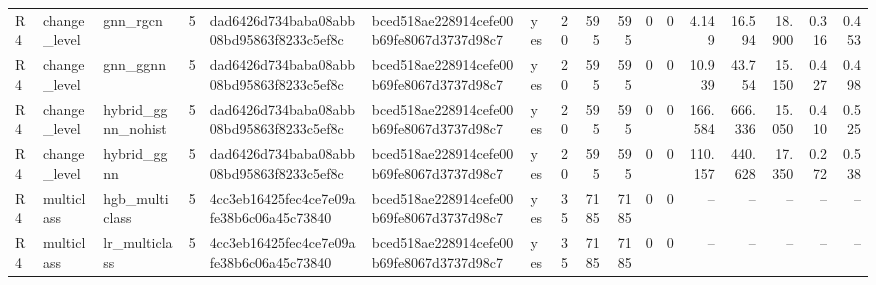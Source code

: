 \begin{table}[htbp]
{\begin{tabular}{lllrlllrrrrrrrrrr}
R4 & change\_level & gnn\_rgcn & 5 & dad6426d734baba08abb08bd95863f8233c5ef8c & bced518ae228914cefe00b69fe8067d3737d98c7 & yes & 20 & 595 & 595 & 0 & 0 & 4.149 & 16.594 & 18.900 & 0.316 & 0.453 \\
R4 & change\_level & gnn\_ggnn & 5 & dad6426d734baba08abb08bd95863f8233c5ef8c & bced518ae228914cefe00b69fe8067d3737d98c7 & yes & 20 & 595 & 595 & 0 & 0 & 10.939 & 43.754 & 15.150 & 0.427 & 0.498 \\
R4 & change\_level & hybrid\_ggnn\_nohist & 5 & dad6426d734baba08abb08bd95863f8233c5ef8c & bced518ae228914cefe00b69fe8067d3737d98c7 & yes & 20 & 595 & 595 & 0 & 0 & 166.584 & 666.336 & 15.050 & 0.410 & 0.525 \\
R4 & change\_level & hybrid\_ggnn & 5 & dad6426d734baba08abb08bd95863f8233c5ef8c & bced518ae228914cefe00b69fe8067d3737d98c7 & yes & 20 & 595 & 595 & 0 & 0 & 110.157 & 440.628 & 17.350 & 0.272 & 0.538 \\
R4 & multiclass & hgb\_multiclass & 5 & 4cc3eb16425fec4ce7e09afe38b6c06a45c73840 & bced518ae228914cefe00b69fe8067d3737d98c7 & yes & 35 & 7185 & 7185 & 0 & 0 & -- & -- & -- & -- & -- \\
R4 & multiclass & lr\_multiclass & 5 & 4cc3eb16425fec4ce7e09afe38b6c06a45c73840 & bced518ae228914cefe00b69fe8067d3737d98c7 & yes & 35 & 7185 & 7185 & 0 & 0 & -- & -- & -- & -- & -- \\
\bottomrule
\end{tabular}}
\end{table}
